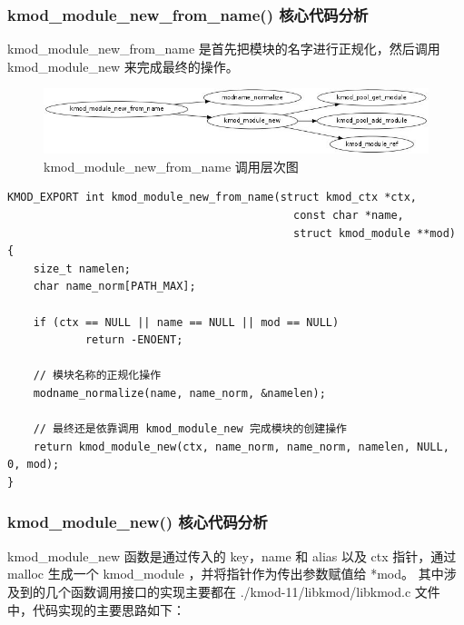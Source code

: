 \documentclass[11pt,a4paper]{article}
\makeatletter
\def\maxwidth{\ifdim\Gin@nat@width>\linewidth\linewidth
\else\Gin@nat@width\fi}
\let\Oldincludegraphics\includegraphics
\renewcommand{\includegraphics}[1]{\Oldincludegraphics[width=\maxwidth]{#1}}
\makeatother
\begin{document}
\subsubsection{kmod\_module\_new\_from\_name() 核心代码分析}

kmod\_module\_new\_from\_name 是首先把模块的名字进行正规化，然后调用
kmod\_module\_new 来完成最终的操作。

\begin{figure}[htbp]
\centering
\includegraphics{./figures/kmod_module_new_from_name.jpg}
\caption{kmod\_module\_new\_from\_name 调用层次图}
\end{figure}

{\begin{shaded}\begin{verbatim}
KMOD_EXPORT int kmod_module_new_from_name(struct kmod_ctx *ctx,
                                            const char *name,
                                            struct kmod_module **mod)
{
    size_t namelen;
    char name_norm[PATH_MAX];

    if (ctx == NULL || name == NULL || mod == NULL)
            return -ENOENT;

    // 模块名称的正规化操作
    modname_normalize(name, name_norm, &namelen);

    // 最终还是依靠调用 kmod_module_new 完成模块的创建操作
    return kmod_module_new(ctx, name_norm, name_norm, namelen, NULL, 0, mod);
}
\end{verbatim}\end{shaded}}
\subsubsection{kmod\_module\_new() 核心代码分析}

kmod\_module\_new 函数是通过传入的 key，name 和 alias 以及 ctx 指针，通过
malloc 生成一个 kmod\_module ，并将指针作为传出参数赋值给 *mod。
其中涉及到的几个函数调用接口的实现主要都在 ./kmod-11/libkmod/libkmod.c
文件中，代码实现的主要思路如下：
\end{document}
